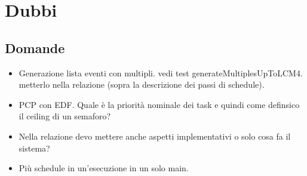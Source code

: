 \chapter{Dubbi}

\section{Domande}
\begin{itemize}
    \item Generazione lista eventi con multipli. vedi test generateMultiplesUpToLCM4. metterlo nella relazione (sopra la descrizione dei passi di schedule).
    \item PCP con EDF. Quale è la priorità nominale dei task e quindi come definsico il ceiling di un semaforo?
    \item Nella relazione devo mettere anche aspetti implementativi o solo cosa fa il sistema?

    \item Più schedule in un'esecuzione in un solo main.
\end{itemize}